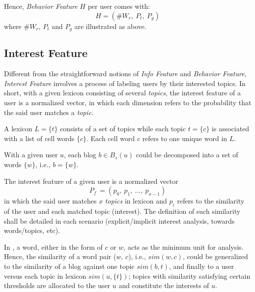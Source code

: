 Hence, \textit{Behavior Feature} $H$ per user comes with:
\begin{equation}
\label{eq:beha}
	H = (\#W_r,\ P_t,\ P_g)
\end{equation}
where $\#W_r$, $P_t$ and $P_g$ are illustrated as above.

\subsection{Interest Feature}

Different from the straightforward notions of \textit{Info Feature} and \textit{Behavior Feature}, \textit{Interest Feature} involves a process of labeling users by their interested topics.
In short, with a given lexicon consisting of several \textit{topics}, the interest feature of a user is a normalized vector, in which each dimension refers to the probability that the said user matches a \textit{topic}.

\begin{definition}
\label{def:lexi}
A lexicon $L = \{t\}$ consists of a set of topics while each topic $t = \{c\}$ is associated with a list of cell words $\{c\}$. Each cell word $c$ refers to one unique word in $L$.
\end{definition}

\begin{definition}
\label{def:bw}
With a given user $u$, each blog $b \in B_s(u)$ could be decomposed into a set of words $\{w\}$, i.e., $b = \{w\}$.
\end{definition}

\begin{definition}
\label{def:inte}
The interest feature of a given user is a normalized vector
\begin{equation}
\label{eq:inte}
P_f\ = (p_0,\ p_1,\ ...,\ p_{x-1})
\end{equation}
in which the said user matches $x$ \textit{topics} in lexicon and $p_i$ refers to the similarity of the user and each matched topic (interest). The definition of such similarity shall be detailed in each scenario (explicit/implicit interest analysis, towards words/topics, etc).
\end{definition}

In \sys{}, a word, either in the form of $c$ or $w$, acts as the minimum unit for analysis.
Hence, the similarity of a word pair ($w$, $c$), i.e., $sim(w, c)$, could be generalized to the similarity of a blog against one topic $sim(b, t)$, and finally to a user versus each topic in lexicon $sim(u, \{t\})$; topics with similarity satisfying certain thresholds are allocated to the user $u$ and constitute the interests of $u$.

